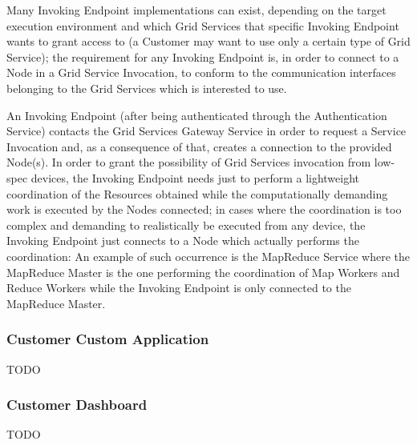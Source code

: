 Many Invoking Endpoint implementations can exist, depending on the target execution environment and which Grid Services that specific Invoking Endpoint wants to grant access to (a Customer may want to use only a certain type of Grid Service); the requirement for any Invoking Endpoint is, in order to connect to a Node in a Grid Service Invocation, to conform to the communication interfaces belonging to the Grid Services which is interested to use.

An Invoking Endpoint (after being authenticated through the Authentication Service) contacts the Grid Services Gateway Service in order to request a Service Invocation and, as a consequence of that, creates a connection to the provided Node(s). In order to grant the possibility of Grid Services invocation from low-spec devices, the Invoking Endpoint needs just to perform a lightweight coordination of the Resources obtained while the computationally demanding work is executed by the Nodes connected; in cases where the coordination is too complex and demanding to realistically be executed from any device, the Invoking Endpoint just connects to a Node which actually performs the coordination: An example of such occurrence is the MapReduce Service where the MapReduce Master is the one performing the coordination of Map Workers and Reduce Workers while the Invoking Endpoint is only connected to the MapReduce Master.

\subsubsection{Customer Custom Application}
TODO

\subsubsection{Customer Dashboard}
TODO
